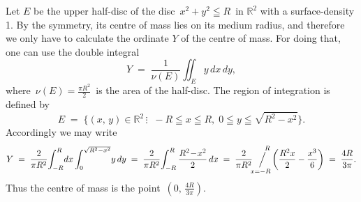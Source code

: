 \documentclass[12pt]{article}
\newcommand{\sijoitus}[2]%
{\operatornamewithlimits{\Big/}_{\!\!\!#1}^{\,#2}}
\begin{document}
Let $E$ be the upper half-disc of the disc\, $x^2+y^2 \leqq R$\, in $\mathbb{R}^2$ with a  surface-density 1.  By the symmetry, its centre of mass lies on its medium radius, and therefore we only have to calculate the ordinate $Y$ of the centre of mass.  For doing that, one can use the double integral
$$Y \;=\; \frac{1}{\nu(E)}\iint_E y\,dx\,dy,$$
where\, $\nu(E) = \frac{\pi R^2}{2}$\, is the area of the half-disc.  The region of integration is defined by
$$E \;=\; \{(x,\,y)\in\mathbb{R}^2\,\vdots\;\; -R\leqq x \leqq R,\; 0 \leqq y \leqq \sqrt{R^2-x^2}\}.$$
Accordingly we may write
$$Y \;=\; \frac{2}{\pi R^2}\!\int_{-R}^R\!dx\int_0^{\sqrt{R^2-x^2}}\!y\,dy \;=\; 
\frac{2}{\pi R^2}\!\int_{-R}^R\frac{R^2\!-\!x^2}{2}\,dx \;=\; 
\frac{2}{\pi R^2}\sijoitus{x=-R}{\quad R}\left(\frac{R^2x}{2}-\frac{x^3}{6}\right) \;=\; \frac{4R}{3\pi}.$$
Thus the centre of mass is the point\, $(0,\,\frac{4R}{3\pi})$.

\end{document}
